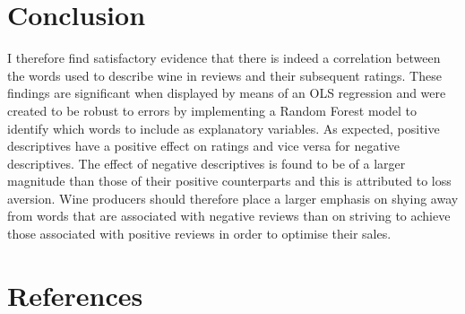 \documentclass[11pt,preprint]{elsarticle}
\numberwithin{equation}{section}
\numberwithin{figure}{section}
\numberwithin{table}{section}
\begin{document}
\newpage

\section{Conclusion}\label{conclusion}

\label{Concl} I therefore find satisfactory evidence that there is
indeed a correlation between the words used to describe wine in reviews
and their subsequent ratings. These findings are significant when
displayed by means of an OLS regression and were created to be robust to
errors by implementing a Random Forest model to identify which words to
include as explanatory variables. As expected, positive descriptives
have a positive effect on ratings and vice versa for negative
descriptives. The effect of negative descriptives is found to be of a
larger magnitude than those of their positive counterparts and this is
attributed to loss aversion. Wine producers should therefore place a
larger emphasis on shying away from words that are associated with
negative reviews than on striving to achieve those associated with
positive reviews in order to optimise their sales.

\newpage

\section*{References}\label{references}
\end{document}
